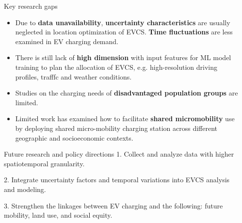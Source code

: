 \documentclass[final]{beamer}
\newlength{\sepwidth}
\newlength{\colwidth}
\newcommand{\separatorcolumn}{\begin{column}{\sepwidth}\end{column}}
\begin{document}
\begin{frame}[t]
\begin{columns}[t]
\begin{column}{\colwidth}
    \begin{alertblock}{Key research gaps}
    \begin{itemize}
      \item Due to \textcolor[RGB]{250,70,22}{\textbf{data unavailability}}, \textcolor[RGB]{250,70,22}{\textbf{\textcolor[RGB]{250,70,22}{\textbf{uncertainty characteristics}}}} are usually neglected in location optimization of EVCS. {\textbf{\textcolor[RGB]{250,70,22}{\textbf{Time fluctuations}}}} are less examined in EV charging demand. 
      \item There is still lack of \textcolor[RGB]{250,70,22}{\textbf{high dimension}} with input features for ML model training to plan the allocation of EVCS, e.g. high-resolution driving profiles, trafffc and weather conditions.
      \item Studies on the charging needs of \textcolor[RGB]{250,70,22}{\textbf{disadvantaged population groups}} are limited. 
      \item Limited work has examined how to facilitate \textcolor[RGB]{250,70,22}{\textbf{shared micromobility}} use by deploying shared micro-mobility charging station across different geographic and socioeconomic contexts.

    \end{itemize}
  \end{alertblock}





  \begin{block}{Future research and policy directions}
1. Collect and analyze data with higher spatiotemporal granularity. 

2. Integrate uncertainty factors and temporal variations into EVCS analysis and modeling.

3. Strengthen the linkages between EV charging and the following: future mobility, land use, and social equity. 




  \end{block}


\end{column}

\separatorcolumn
\end{columns}
\end{frame}
\end{document}
